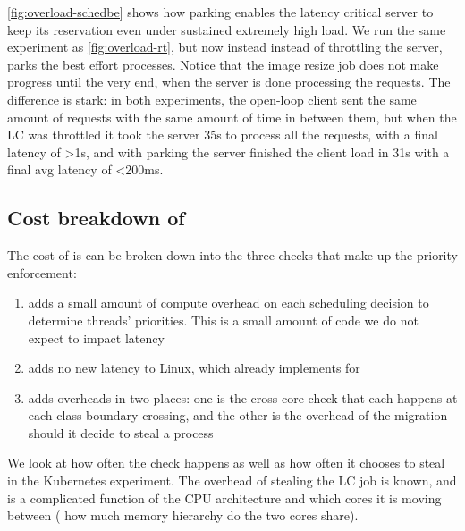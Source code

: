 \autoref{fig:overload-schedbe} shows how parking enables the latency critical
server to keep its reservation even under sustained extremely high load. We run
the same experiment as \autoref{fig:overload-rt}, but now instead instead of
throttling the server, \schedbe{} parks the best effort processes. Notice that
the \schedbe{} image resize job does not make progress until the very end, when
the server is done processing the requests. The difference is stark: in both
experiments, the open-loop client sent the same amount of requests with the same
amount of time in between them, but when the LC was throttled it took the server
35s to process all the requests, with a final latency of >1s, and with parking
the server finished the client load in 31s with a final avg latency of <200ms. 



\subsection{Cost breakdown of \schedbe{}}

The cost of \schedbe{} is can be broken down into the three checks that make up
the priority enforcement:

\begin{enumerate}
    \item \local{} adds a small amount of compute overhead on each scheduling
    decision to determine threads' priorities. This is a small amount of code we
    do not expect to impact latency
    \item \entry{} adds no new latency to Linux, which already implements
    \entry{} for \schedidle{}
    \item \exit{} adds overheads in two places: one is the cross-core check that
    each happens at each class boundary crossing, and the other is the overhead
    of the migration should it decide to steal a \schednormal{} process
\end{enumerate}

We look at how often the \exit{} check happens as well as how often it chooses
to steal in the Kubernetes experiment. The overhead of stealing the LC job is
known, and is a complicated function of the CPU architecture and which cores it
is moving between (\eg{} how much memory hierarchy do the two cores share).

